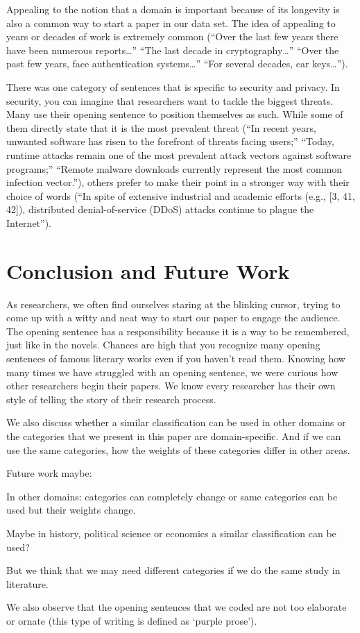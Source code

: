 \documentclass[sigconf,anonymous]{acmart}
\begin{document}
Appealing to the notion that a domain is important because of its longevity is also a common way to start a paper in our data set. The idea of appealing to years or decades of work is extremely common (``Over the last few years there have been numerous reports…'' ``The last decade in cryptography…'' ``Over the past few years, face authentication systems…'' ``For several decades, car keys…''). 

There was one category of sentences that is specific to security and privacy. In security, you can imagine that researchers want to tackle the biggest threats. Many use their opening sentence to position themselves as such. While some of them directly state that it is the most prevalent threat (``In recent years, unwanted software has risen to the forefront of threats facing users;'' ``Today, runtime attacks remain one of the most prevalent attack vectors against software programs;'' ``Remote malware downloads currently represent the most common infection vector.''), others prefer to make their point in a stronger way with their choice of words (``In spite of extensive industrial and academic efforts (e.g., [3, 41, 42]), distributed denial-of-service (DDoS) attacks continue to plague the Internet'').

	
	\section{Conclusion and Future Work}
	
	As researchers, we often find ourselves staring at the blinking cursor, trying to come up with a witty and neat way to start our paper to engage the audience. The opening sentence has a responsibility because it is a way to be remembered, just like in the novels. Chances are high that you recognize many opening sentences of famous literary works even if you haven’t read them. Knowing how many times we have struggled with an opening sentence, we were curious how other researchers begin their papers. We know every researcher has their own style of telling the story of their research process. 
	
	We also discuss whether a similar classification can be used in other domains or the categories that we present in this paper are domain-specific. And if we can use the same categories, how the weights of these categories differ in other areas.
	
	Future work maybe:
	
	In other domains: categories can completely change or same categories can be used but their weights change.
	
	Maybe in history, political science or economics a similar classification can be used?
	
	But we think that we may need different categories if we do the same study in literature. 
	
	
	We also observe that the opening sentences that we coded are not too elaborate or ornate (this type of writing is defined as `purple prose').
	
	
	
	
	
\end{document}
